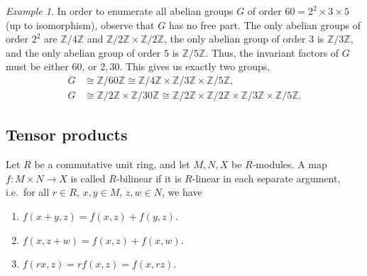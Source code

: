 \documentclass[11pt]{article}
\newcommand{\Z}{\mathbb{Z}}
\theoremstyle{definition}
\theoremstyle{remark}
\newtheorem*{example}{Example}
\numberwithin{equation}{section}
\begin{document}
    \begin{example}
        In order to enumerate all abelian groups $G$ of order $60 = 2^2 \times 3
        \times 5$ (up to isomorphism), observe that $G$ has no free part. The only
        abelian groups of order $2^2$ are $\Z/4\Z$ and $\Z/2\Z\times \Z/2\Z$, the
        only abelian group of order $3$ is $\Z/3\Z$, and the only abelian group of
        order $5$ is $\Z/5\Z$. Thus, the invariant factors of $G$ must be either
        $60$, or $2, 30$. This gives us exactly two groups, \begin{align*}
            G &\cong \Z/60\Z \cong \Z/4\Z \times \Z/3\Z \times \Z/5\Z, \\
            G &\cong \Z/2\Z \times \Z/30\Z \cong \Z/2\Z\times \Z/2\Z \times \Z/3\Z
            \times \Z/5\Z.
        \end{align*}
    \end{example}


    \subsection{Tensor products}

    \begin{definition}
        Let $R$ be a commutative unit ring, and let $M, N, X$ be $R$-modules. A map
        $f\colon M\times N \to X$ is called $R$-bilinear if it is $R$-linear in each
        separate argument, i.e.\ for all $r \in R$, $x, y \in M$, $z, w \in N$, we
        have \begin{enumerate}
            \itemsep0em
            \item $f(x + y, z) = f(x, z) + f(y, z)$.
            \item $f(x, z + w) = f(x, z) + f(x, w)$.
            \item $f(rx, z) = rf(x, z) = f(x, rz)$.
        \end{enumerate}
    \end{definition}
\end{document}
